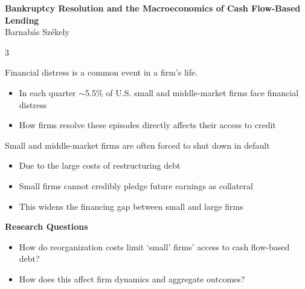 \documentclass[10pt]{article}
\begin{document}

{\centering
{\fontsize{34}{38}\selectfont \textbf{Bankruptcy Resolution and the Macroeconomics of Cash Flow-Based Lending}}\\[0.20in]
{\fontsize{18}{20}\selectfont Barnab\'as Sz\'ekely \hspace{0.3in}}\\[0.35in]
}

\begin{multicols}{3}


\begin{tcolorbox}[title=Motivation]
Financial distress is a common event in a firm's life.
\begin{itemize}
    \item In each quarter $\sim$5.5\% of U.S. small and middle-market firms face financial distress     
    \item How firms resolve these episodes directly affects their access to credit
\end{itemize} \vspace{3mm}

Small and middle-market firms are often forced to shut down in default 
\begin{itemize}
    \item Due to the large costs of restructuring debt
    \item Small firms cannot credibly pledge future earnings as collateral
    \item This widens the financing gap between small and large firms
\end{itemize}
\vspace{3mm}

\textbf{Research Questions}
\begin{itemize}
    \item[1.] How do reorganization costs limit `small' firms' access to cash flow-based debt?
    \item[2.] How does this affect firm dynamics and aggregate outcomes?
\end{itemize}
\end{tcolorbox}


\end{multicols}
\end{document}
